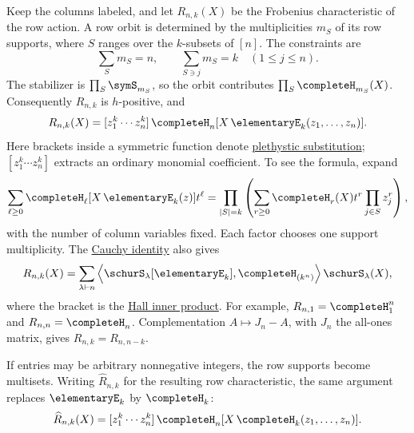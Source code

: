 \begin{example}
\label{regularMatrixRowAction}
Keep the columns labeled, and let
$R_{n,k}(X)$ be the Frobenius characteristic of the row action.
A row orbit is determined by the multiplicities $m_S$ of its row supports,
where $S$ ranges over the $k$-subsets of $[n]$. The constraints are
\[
 \sum_Sm_S=n,\qquad \sum_{S\ni j}m_S=k\quad(1\leq j\leq n).
\]
The stabilizer is $\prod_S\symS_{m_S}$, so the orbit contributes
$\prod_S\completeH_{m_S}(X)$. Consequently $R_{n,k}$ is
$h$-positive, and
\[
 R_{n,k}(X)
 =[z_1^k\dotsm z_n^k]\,
 \completeH_n[X\,\elementaryE_k(z_1,\dotsc,z_n)].
\]
Here brackets inside a symmetric function denote
\hyperref[plethysm]{plethystic substitution}; $[z_1^k\dotsm z_n^k]$
extracts an ordinary monomial coefficient.
To see the formula, expand
\[
 \sum_{\ell\geq0}\completeH_\ell[X\,\elementaryE_k(z)]t^\ell
 =\prod_{|S|=k}\left(\sum_{r\geq0}
       \completeH_r(X)t^r\prod_{j\in S}z_j^r\right),
\]
with the number of column variables fixed.
Each factor chooses one support multiplicity.
The \hyperref[schurCauchyFormula]{Cauchy identity} also gives
\[
 R_{n,k}(X)=\sum_{\lambda\vdash n}
 \left\langle\schurS_\lambda[\elementaryE_k],
                   \completeH_{(k^n)}\right\rangle\schurS_\lambda(X),
\]
where the bracket is the \hyperref[hallInnerProduct]{Hall inner product}.
For example, $R_{n,1}=\completeH_1^n$ and $R_{n,n}=\completeH_n$.
Complementation $A\mapsto J_n-A$, with $J_n$ the all-ones matrix,
gives $R_{n,k}=R_{n,n-k}$.

If entries may be arbitrary nonnegative integers, the row supports become
multisets. Writing $\widehat R_{n,k}$ for the resulting row characteristic,
the same argument replaces $\elementaryE_k$ by $\completeH_k$:
\[
 \widehat R_{n,k}(X)
 =[z_1^k\dotsm z_n^k]\,
 \completeH_n[X\,\completeH_k(z_1,\dotsc,z_n)].
\]
\end{example}

